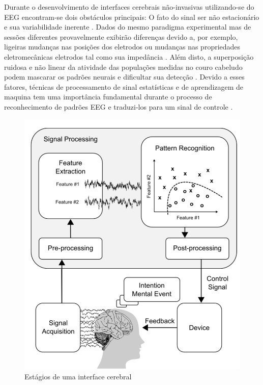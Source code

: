 \par
Durante o desenvolvimento de interfaces cerebrais n\~ao-invasivas utilizando-se do \ac{EEG} encontram-se dois obst\'aculos principais: O fato do sinal ser n\~ao estacion\'ario e sua variabilidade inerente \cite{Rao2010}.
Dados do mesmo paradigma experimental mas de sess\~oes diferentes provavelmente exibir\~ao diferen\c{c}as devido a, por exemplo, ligeiras mudan\c{c}as nas posi\c{c}\~oes dos eletrodos ou mudan\c{c}as nas propriedades eletromec\^anicas eletrodos tal como sua imped\^ancia \cite{Rao2010}.
Al\'em disto, a superposi\c{c}\~ao ruidosa e n\~ao linear da atividade das popula\c{c}\~oes medidas no couro cabeludo podem mascarar os padr\~oes neurais e dificultar sua detec\c{c}\~ao \cite{Rao2010}.
Devido a esses fatores, t\'ecnicas de processamento de sinal estat\'isticas e de aprendizagem de maquina tem uma import\^ancia fundamental durante o processo de reconhecimento de padr\~oes \ac{EEG} e traduzi-los para um sinal de controle \cite{Rao2010}.

\begin{figure}[h!]
	\label{fig:introduction}
	\caption{Est\'agios de uma interface cerebral \cite{Rao2010}}
	\centering
	\includegraphics[scale=0.45]{./figuras/bci-stages}
\end{figure}

